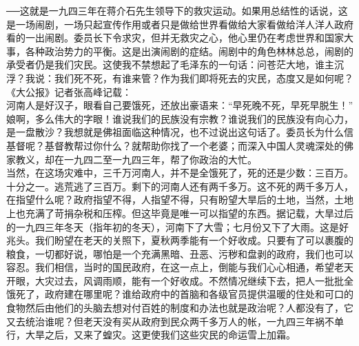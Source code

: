 ──这就是一九四三年在蒋介石先生领导下的救灾运动。如果用总结性的话说，这是一场闹剧，一场只起宣传作用或者只是做给世界看做给大家看做给洋人洋人政府看的一出闹剧。委员长下令求灾，但并无救灾之心，他心里仍在考虑世界和国家大事，各种政治势力的平衡。这是出演闹剧的症结。闹剧中的角色林林总总，闹剧的承受者仍是我们灾民。这使我不禁想起了毛泽东的一句话：问苍茫大地，谁主沉浮？我说：我们死不死，有谁来管？作为我们即将死去的灾民，态度又是如何呢？《大公报》记者张高峰记载：\\

河南人是好汉子，眼看自己要饿死，还放出豪语来：“早死晚不死，早死早脱生！”\\

娘啊，多么伟大的字眼！谁说我们的民族没有宗教？谁说我们的民族没有向心力，是一盘散沙？我想就是佛祖面临这种情况，也不过说出这句话了。委员长为什么信基督呢？基督教帮过你什么？就帮助你找了一个老婆；而深入中国人灵魂深处的佛家教义，却在一九四二至一九四三年，帮了你政治的大忙。\\

当然，在这场灾难中，三千万河南人，并不是全饿死了，死的还是少数：三百万。十分之一。逃荒逃了三百万。剩下的河南人还有两千多万。这不死的两千多万人，在指望什么呢？政府指望不得，人指望不得，只有盼望大旱后的土地，当然，土地上也充满了苛捐杂税和压榨。但这毕竟是唯一可以指望的东西。据记载，大旱过后的一九四三年冬天（指年初的冬天），河南下了大雪；七月份又下了大雨。这是好兆头。我们盼望在老天的关照下，夏秋两季能有一个好收成。只要有了可以裹腹的粮食，一切都好说，哪怕是一个充满黑暗、丑恶、污秽和盘剥的政府，我们也可以容忍。我们相信，当时的国民政府，在这一点上，倒能与我们心心相通，希望老天开眼，大灾过去，风调雨顺，能有一个好收成。不然情况继续下去，把人一批批全饿死了，政府建在哪里呢？谁给政府中的首脑和各级官员提供温暖的住处和可口的食物然后由他们的头脑去想对付百姓的制度和办法也就是政治呢？人都没有了，它又去统治谁呢？但老天没有买从政府到民众两千多万人的帐，一九四三年祸不单行，大旱之后，又来了蝗灾。这更使我们这些灾民的命运雪上加霜。\\